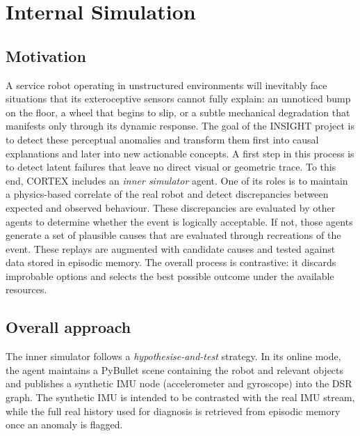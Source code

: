 \documentclass[a4paper, twoside]{article}
\begin{document}


\section{Internal Simulation}

\subsection{Motivation}

A service robot operating in unstructured environments will inevitably face situations that its exteroceptive sensors cannot fully explain: an unnoticed bump on the floor, a wheel that begins to slip, or a subtle mechanical degradation that manifests only through its dynamic response. The goal of the INSIGHT project is to detect these perceptual anomalies and transform them first into causal explanations and later into new actionable concepts.
A first step in this process is to detect latent failures that leave no direct visual or geometric trace. To this end, CORTEX includes an \emph{inner simulator} agent. One of its roles is to maintain a physics-based correlate of the real robot and detect discrepancies between expected and observed behaviour. These discrepancies are evaluated by other agents to determine whether the event is logically acceptable. If not, those agents generate a set of plausible causes that are evaluated through recreations of the event. These replays are augmented with candidate causes and tested against data stored in episodic memory. The overall process is contrastive: it discards improbable options and selects the best possible outcome under the available resources.

\subsection{Overall approach}

The inner simulator follows a \emph{hypothesise-and-test} strategy.
In its online mode, the agent maintains a PyBullet scene containing the robot and relevant objects and publishes a synthetic IMU node (accelerometer and gyroscope) into the DSR graph.
The synthetic IMU is intended to be contrasted with the real IMU stream, while the full real history used for diagnosis is retrieved from episodic memory once an anomaly is flagged.
\end{document}

